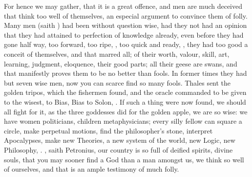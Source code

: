 For hence we may gather, that it is a great offence, and men are much
deceived that think too well of themselves, an especial argument to
convince them of folly. Many men (saith \Seneca) had been without
question wise, had they not had an opinion that they had attained to
perfection of knowledge already, even before they had gone half way,
too forward, too ripe, , too quick and ready, , they had too good a conceit of
themselves, and that marred all; of their worth, valour, skill, art,
learning, judgment, eloquence, their good parts; all their geese are
swans, and that manifestly proves them to be no better than fools. In
former times they had but seven wise men, now you can scarce find so
many fools. Thales sent the golden tripos, which the fishermen found,
and the oracle commanded to be  given to the wisest, to Bias, Bias
to Solon, \etc{}. If such a thing were now found, we should all fight for
it, as the three goddesses did for the golden apple, we are so wise: we
have women politicians, children metaphysicians; every silly fellow can
square a circle, make perpetual motions, find the philosopher's stone,
interpret Apocalypses, make new Theories, a new system of the world,
new Logic, new Philosophy, \etc{}. , saith
Petronius, our country is so full of deified spirits, divine
souls, that you may sooner find a God than a man amongst us, we think
so well of ourselves, and that is an ample testimony of much folly.

